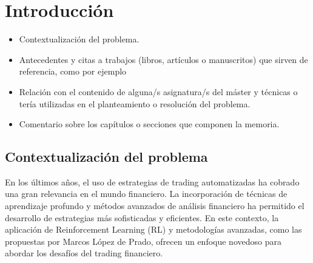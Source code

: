 \documentclass[a4paper,12pt]{report}
\begin{document}
\renewcommand{\tablename}{\textbf{Tabla}} %
\renewcommand{\figurename}{\textbf{Figura}} %
\renewcommand{\listtablename}{Índice de tablas}

\title{}
\date{}
\maketitle


\clearpage
{}
\setcounter{page}{1}

\tableofcontents

\listoffigures

\listoftables


\clearpage
{}
\setcounter{page}{1}


\chapter{Introducción}

\begin{itemize}

\item Contextualización del problema.

\item Antecedentes y citas a trabajos (libros, artículos o manuscritos) que sirven de referencia, como por ejemplo \cite{DindosPipherRule2016}

\item Relación con el contenido de alguna/s asignatura/s del máster y técnicas o tería utilizadas en el planteamiento o resolución del problema.

\item Comentario sobre los capítulos o secciones que componen la memoria.

\end{itemize}

\section{Contextualización del problema}

En los últimos años, el uso de estrategias de trading automatizadas ha cobrado una gran relevancia en el mundo financiero. La incorporación de 
técnicas de aprendizaje profundo y métodos avanzados de análisis financiero ha permitido el desarrollo de estrategias más sofisticadas y eficientes. 
En este contexto, la aplicación de Reinforcement Learning (RL) y metodologías avanzadas, como las propuestas por Marcos López de Prado, ofrecen un 
enfoque novedoso para abordar los desafíos del trading financiero.
\end{document}
